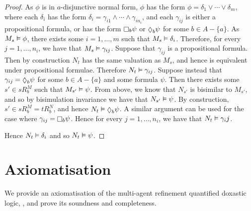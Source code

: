 \begin{proof}
As $\phi$ is in $a$-disjunctive normal form, $\phi$ has the form $\phi =
\delta_1 \lor \cdots \lor \delta_m$, where each $\delta_i$ has the form
$\delta_i = \gamma_{i1} \land \cdots \land \gamma_{in_i}$, and each $\gamma_{ij}$ is
either a propositional formula, or has the form $\knows_b \psi$ or $\suspects_b
\psi$ for some $b \in A - \{a\}$.  As $M_s \vDash \phi$, there exists some $i
= 1, \dots, m$ such that $M_s \vDash \delta_i$. Therefore, for every $j = 1,
\dots, n_i$, we have that $M_s \vDash \gamma_{ij}$. Suppose that
$\gamma_{ij}$ is a propositional formula. Then by construction $N_t$ has the
same valuation as $M_s$, and hence is equivalent under propositional formulae.
Therefore $N_t \vDash \gamma_{ij}$.  Suppose instead that $\gamma_{ij} =
\suspects_b \psi$ for some $b \in A - \{a\}$ and some formula $\psi$. Then there
exists some $s' \in sR^M_b$ such that $M_{s'} \vDash \psi$. From above, we
know that $N_{s'}$ is bisimilar to $M_{s'}$, and so by bisimulation invariance
we have that $N_{s'} \vDash \psi$.  By construction, $s' \in sR^M_b = tR^N_b$,
and hence $N_t \entails \suspects_b \psi$. A similar argument can be used for
the case where $\gamma_{ij} = \knows_b \psi$. Hence for every $j = 1, \dots,
n_i$, we have that $N_t \vDash \gamma_ij$.

Hence $N_t \vDash \delta_i$ and so $N_t \vDash \psi$.
\end{proof}

\section{Axiomatisation}

We provide an axiomatisation of the multi-agent refinement quantified doxastic
logic, \logicKDF{}, and prove its soundness and completeness.

